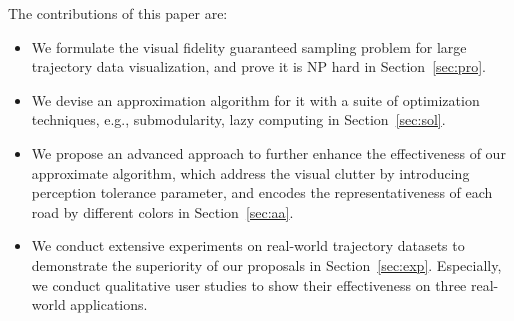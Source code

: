 The contributions of this paper are:
\begin{itemize}[noitemsep]
  \item We formulate the visual fidelity guaranteed sampling problem for large trajectory data visualization, and prove it is NP hard in Section~\ref{sec:pro}.
  \item We devise an approximation algorithm for it with a suite of optimization techniques, e.g., submodularity, lazy computing in Section~\ref{sec:sol}.
  \item We propose an advanced approach to further enhance the effectiveness of our approximate algorithm, which address the visual clutter by introducing perception tolerance parameter,
  and encodes the representativeness of each road by different colors in Section~\ref{sec:aa}.
  \item We conduct extensive experiments on real-world trajectory datasets to demonstrate the superiority of our proposals in Section~\ref{sec:exp}. Especially, we conduct qualitative user studies to show their effectiveness on three real-world applications.
\end{itemize}



%


